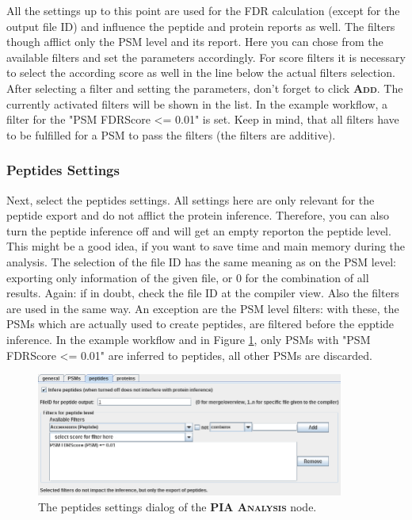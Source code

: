\documentclass[a4paper,11pt,twoside]{article}
\newcommand{\menu}[1]{{\scshape\bfseries #1}}
\newcommand{\knimenode}[1]{{\scshape\bfseries #1}}
\begin{document}
All the settings up to this point are used for the FDR calculation (except for
the output file ID) and influence the peptide and protein reports as well. The
filters though afflict only the PSM level and its report. Here you can chose
from the available filters and set the parameters accordingly. For score filters
it is necessary to select the according score as well in the line below the
actual filters selection. After selecting a filter and setting the parameters,
don't forget to click \menu{Add}. The currently activated filters will be shown
in the list. In the example workflow, a filter for the "PSM FDRScore <= 0.01" is
set. Keep in mind, that all filters have to be fulfilled for a PSM to pass the
filters (the filters are additive).


\subsubsection{Peptides Settings}

Next, select the peptides settings. All settings here are only relevant for the
peptide export and do not afflict the protein inference. Therefore, you can also
turn the peptide inference off and will get an empty reporton the peptide level.
This might be a good idea, if you want to save time and main memory during the
analysis. The selection of the file ID has the same meaning as on the PSM level:
exporting only information of the given file, or 0 for the combination of all
results. Again: if in doubt, check the file ID at the compiler view. Also the
filters are used in the same way. An exception are the PSM level filters: with
these, the PSMs which are actually used to create peptides, are filtered before
the epptide inference. In the example workflow and in Figure
\ref{pia_settings_peptides}, only PSMs with "PSM FDRScore <= 0.01" are inferred
to peptides, all other PSMs are discarded.

\begin{figure}[ht!]
	\centering
	\includegraphics[width=0.9\textwidth]{graphics/pia_settings_peptides}
	\caption{The peptides settings dialog of the \knimenode{PIA Analysis} node.}
	\label{pia_settings_peptides}
\end{figure}
\end{document}
